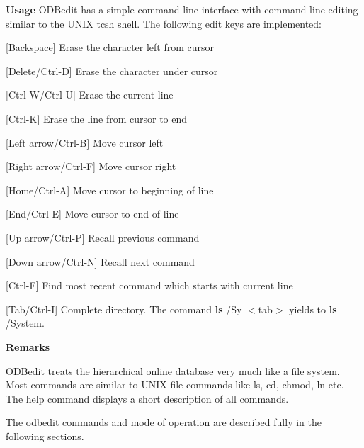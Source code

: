 \begin{DoxyItemize}
\item {\bfseries  Usage } ODBedit has a simple command line interface with command line editing similar to the UNIX tcsh shell. The following edit keys are implemented:
\begin{DoxyItemize}
\item \mbox{[}Backspace\mbox{]} Erase the character left from cursor
\item \mbox{[}Delete/Ctrl-\/D\mbox{]} Erase the character under cursor
\item \mbox{[}Ctrl-\/W/Ctrl-\/U\mbox{]} Erase the current line
\item \mbox{[}Ctrl-\/K\mbox{]} Erase the line from cursor to end
\item \mbox{[}Left arrow/Ctrl-\/B\mbox{]} Move cursor left
\item \mbox{[}Right arrow/Ctrl-\/F\mbox{]} Move cursor right
\item \mbox{[}Home/Ctrl-\/A\mbox{]} Move cursor to beginning of line
\item \mbox{[}End/Ctrl-\/E\mbox{]} Move cursor to end of line
\item \mbox{[}Up arrow/Ctrl-\/P\mbox{]} Recall previous command
\item \mbox{[}Down arrow/Ctrl-\/N\mbox{]} Recall next command
\item \mbox{[}Ctrl-\/F\mbox{]} Find most recent command which starts with current line
\item \mbox{[}Tab/Ctrl-\/I\mbox{]} Complete directory. The command {\bfseries ls} /Sy $<$tab$>$ yields to {\bfseries ls} /System.
\end{DoxyItemize}
\end{DoxyItemize}


\begin{DoxyItemize}
\item {\bfseries  Remarks }
\begin{DoxyItemize}
\item ODBedit treats the hierarchical online database very much like a file system. Most commands are similar to UNIX file commands like ls, cd, chmod, ln etc. The help command displays a short description of all commands.
\end{DoxyItemize}
\end{DoxyItemize}

The odbedit commands and mode of operation are described fully in the following sections.

